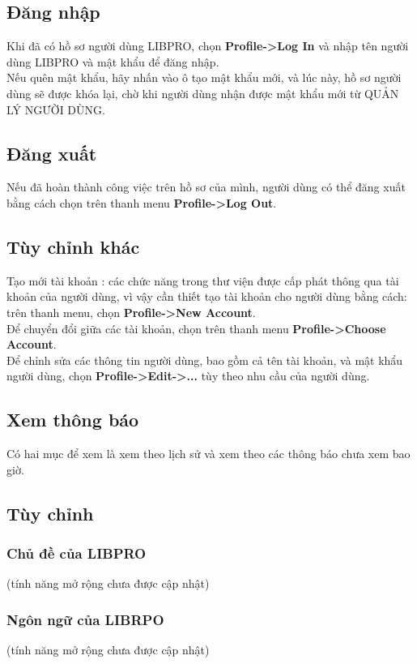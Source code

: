 \documentclass[12pt,a4paper]{report}
\begin{document}
			\subsection{Đăng nhập}
			Khi đã có hồ sơ người dùng LIBPRO, chọn \textbf{Profile->Log In} và nhập tên người dùng LIBPRO và mật khẩu để đăng nhập.\\
			Nếu quên mật khẩu, hãy nhấn vào ô tạo mật khẩu mới, và lúc này, hồ sơ người dùng sẽ được khóa lại, chờ khi người dùng nhận được mật khẩu mới từ QUẢN LÝ NGƯỜI DÙNG.\\
			\subsection{Đăng xuất}
			Nếu đã hoàn thành công việc trên hồ sơ của mình, người dùng có thể đăng xuất bằng cách chọn trên thanh menu \textbf{Profile->Log Out}.\\
			\subsection{Tùy chỉnh khác}
			Tạo mới tài khoản : các chức năng trong thư viện được cấp phát thông qua tài khoản của người dùng, vì vậy cần thiết tạo tài khoản cho người dùng bằng cách: trên thanh menu, chọn \textbf{Profile->New Account}.\\
			Để chuyển đổi giữa các tài khoản, chọn trên thanh menu \textbf{Profile->Choose Account}.\\
			Để chỉnh sửa các thông tin người dùng, bao gồm cả tên tài khoản, và mật khẩu người dùng, chọn \textbf{Profile->Edit->...} tùy theo nhu cầu của người dùng.\\
		\subsection{Xem thông báo}
			Có hai mục để xem là xem theo lịch sử và xem theo các thông báo chưa xem bao giờ.\\
		\subsection{Tùy chỉnh}
			\subsubsection{Chủ đề của LIBPRO} (tính năng mở rộng chưa được cập nhật)\\
			\subsubsection{Ngôn ngữ của LIBRPO} (tính năng mở rộng chưa được cập nhật)\\
\end{document}
